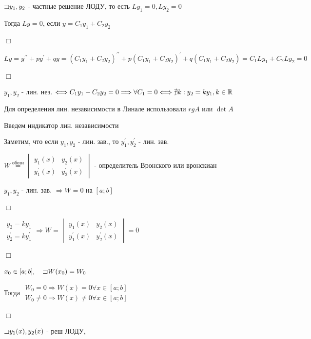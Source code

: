 \documentclass[12pt]{article}
\begin{document}
     $\mathord{\sqsupset} y_1, y_2$ - частные решение ЛОДУ, то есть $Ly_1 = 0, Ly_2 = 0$

    Тогда $Ly = 0$, если $y = C_1 y_1 + C_2 y_2$

    $\Box$

    $Ly = y^{\prime\prime} + py^\prime + qy = (C_1 y_1 + C_2 y_2)^{\prime\prime} + p(C_1 y_1 + C_2 y_2)^{\prime} + q(C_1 y_1 + C_2 y_2) = C_1 Ly_1 + C_2 L y_2 = 0$

    $\Box$

    \Def $y_1, y_2$ - лин. нез. $\Longleftrightarrow C_1 y_1 + C_2 y_2 = 0 \Longrightarrow \forall C_1 = 0 \Longleftrightarrow \nexists k : y_2 = k y_1, k \in \mathbb{R}$

    \Mem Для определения лин. независимости в Линале использовали $rg A$ или $\det A$

    Введем индикатор лин. независимости

    Заметим, что если $y_1, y_2$ - лин. зав., то $y_1^\prime, y_2^\prime$ - лин. зав.

    \Def $W \stackrel{\text{обозн}}{=} \begin{vmatrix}y_1(x) & y_2(x) \\ y_1^\prime(x) & y_2^\prime(x)\end{vmatrix}$ - определитель Вронского или вронскиан

     $y_1, y_2$ - лин. зав. $\Longrightarrow W = 0$ на $[a;b]$

    $\Box$

    $\begin{matrix}y_2 = k y_1 \\ y_2^\prime = k y_1^\prime\end{matrix} \Longrightarrow W = \begin{vmatrix}y_1(x) & y_2(x) \\ y_1^\prime(x) & y_2^\prime(x)\end{vmatrix} = 0$

    $\Box$

     $x_0 \in [a;b], \quad \mathord{\sqsupset} W(x_0) = W_0$

    Тогда $\begin{matrix}W_0 = 0 \Longrightarrow W(x) = 0 \forall x \in [a;b] \\
    W_0 \neq 0 \Longrightarrow W(x) \neq 0 \forall x \in [a;b]\end{matrix}$

    $\Box$

    $\mathord{\sqsupset} y_1(x), y_2(x)$ - реш ЛОДУ,
\end{document}
